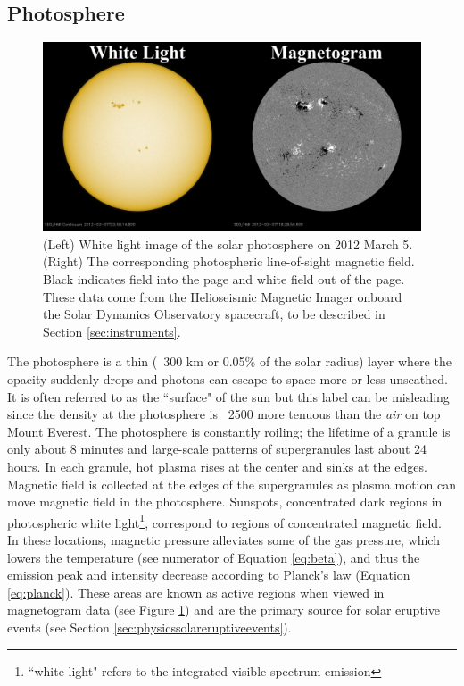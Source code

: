 \subsection{Photosphere}

\begin{figure}[!h]
    \begin{center}
	    \includegraphics[width=\textwidth]{Images/WhiteLightAndMagnetogram.png}
    \end{center}
    \caption[Sunspots and Active Regions]{
        (Left) White light image of the solar photosphere on 2012 March 5. (Right) The corresponding photospheric 
        line-of-sight magnetic field. Black indicates field into the page and white field out of the page. These data
        come from the Helioseismic Magnetic Imager onboard the Solar Dynamics Observatory spacecraft, to be described
        in Section \ref{sec:instruments}. 
    }
    \label{fig:sunspotsandars}
\end{figure}

The photosphere is a thin (~300 km or 0.05\% of the solar radius) layer where the opacity suddenly drops and photons can escape to space more or less unscathed. It is often referred to as the ``surface" of the sun but this label can be misleading since the density at the photosphere is ~2500 more tenuous than the \textit{air} on top Mount Everest. The photosphere is constantly roiling; the lifetime of a granule is only about 8 minutes and large-scale patterns of supergranules last about 24 hours. In each granule, hot plasma rises at the center and sinks at the edges. Magnetic field is collected at the edges of the supergranules as plasma motion can move magnetic field in the photosphere. Sunspots, concentrated dark regions in photospheric white light\footnote{``white light" refers to the integrated visible spectrum emission}, correspond to regions of concentrated magnetic field. In these locations, magnetic pressure alleviates some of the gas pressure, which lowers the temperature (see numerator of Equation \ref{eq:beta}), and thus the emission peak and intensity decrease according to Planck's law (Equation \ref{eq:planck}). These areas are known as active regions when viewed in magnetogram data (see Figure \ref{fig:sunspotsandars}) and are the primary source for solar eruptive events (see Section \ref{sec:physicssolareruptiveevents}). 


